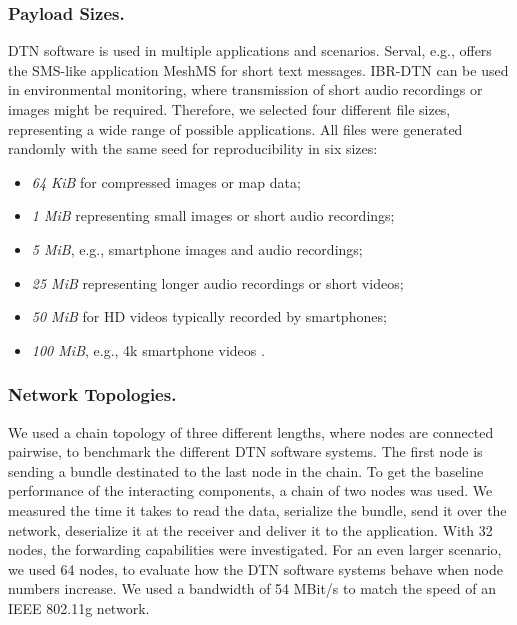 
\subsubsection{Payload Sizes.}
DTN software is used in multiple applications and scenarios.
Serval, e.g., offers the SMS-like application MeshMS for short text messages.
IBR-DTN can be used in environmental monitoring, where transmission of short audio recordings or images might be required. 
Therefore, we selected four different file sizes, representing a wide range of possible applications.
All files were generated randomly with the same seed for reproducibility in six sizes:

\begin{itemize}
    \item 
\textit{64 KiB} for compressed images or map data;
\item
\textit{1 MiB} representing small images or short audio recordings;
\item
\textit{5 MiB}, e.g., smartphone images and audio recordings;
\item
\textit{25 MiB} representing longer audio recordings or short videos;
\item
\textit{50 MiB} for HD videos typically recorded by smartphones;
\item
\textit{100 MiB}, e.g., 4k smartphone videos \cite{trono2015dtn,schildt2011ibr,baumgaertner2016experimental}.
\end{itemize}


\subsubsection{Network Topologies.}
We used a chain topology of three different lengths, where nodes are connected pairwise, to benchmark the different DTN software systems.
The first node is sending a bundle destinated to the last node in the chain.
To get the baseline performance of the interacting components, a chain of two nodes was used.
We measured the time it takes to read the data, serialize the bundle, send it over the network, deserialize it at the receiver and deliver it to the application.
With 32 nodes, the forwarding capabilities were investigated.
For an even larger scenario, we used 64 nodes, to evaluate how the DTN software systems behave when node numbers increase.
We used a bandwidth of 54 MBit/s to match the speed of an IEEE 802.11g network. 


